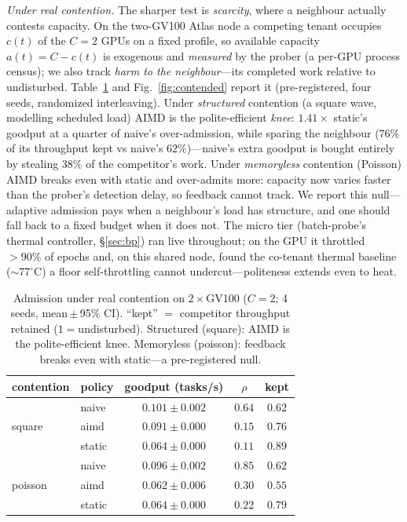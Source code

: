 \documentclass[conference]{IEEEtran}
\begin{document}
\emph{Under real contention.} The sharper test is \emph{scarcity}, where a
neighbour actually contests capacity. On the two-GV100 Atlas node a competing
tenant occupies $c(t)$ of the $C{=}2$ GPUs on a fixed profile, so available
capacity $a(t){=}C{-}c(t)$ is exogenous and \emph{measured} by the prober (a
per-GPU process census); we also track \emph{harm to the neighbour}---its completed
work relative to undisturbed. Table~\ref{tab:contended} and Fig.~\ref{fig:contended}
report it (pre-registered, four seeds, randomized interleaving). Under
\emph{structured} contention (a square wave, modelling scheduled load) AIMD is the
polite-efficient \emph{knee}: $1.41\times$ static's goodput at a quarter of naive's
over-admission, while sparing the neighbour ($76\%$ of its throughput kept vs
naive's $62\%$)---naive's extra goodput is bought entirely by stealing $38\%$ of the
competitor's work. Under \emph{memoryless} contention (Poisson) AIMD breaks even
with static and over-admits more: capacity now varies faster than the prober's
detection delay, so feedback cannot track. We report this null---adaptive admission
pays when a neighbour's load has structure, and one should fall back to a fixed
budget when it does not. The micro tier (batch-probe's thermal controller,
\S\ref{sec:bp}) ran live throughout; on the GPU it throttled $>\!90\%$ of epochs
and, on this shared node, found the co-tenant thermal baseline ($\sim$$77^\circ$C)
a floor self-throttling cannot undercut---politeness extends even to heat.

\begin{table}[t]\centering\caption{Admission under real contention on
$2{\times}$GV100 ($C{=}2$; 4 seeds, mean\,$\pm$\,95\% CI). ``kept'' $=$ competitor
throughput retained ($1{=}$undisturbed). Structured (square): AIMD is the
polite-efficient knee. Memoryless (poisson): feedback breaks even with static---a
pre-registered null.}\label{tab:contended}
\begin{tabular}{llccc}\toprule
contention & policy & goodput (tasks/s) & $\rho$ & kept \\\midrule
\multirow{3}{*}{square}
 & naive  & $0.101\pm0.002$ & $0.64$ & $0.62$ \\
 & aimd   & $0.091\pm0.000$ & $0.15$ & $0.76$ \\
 & static & $0.064\pm0.000$ & $0.11$ & $0.89$ \\\midrule
\multirow{3}{*}{poisson}
 & naive  & $0.096\pm0.002$ & $0.85$ & $0.62$ \\
 & aimd   & $0.062\pm0.006$ & $0.30$ & $0.55$ \\
 & static & $0.064\pm0.000$ & $0.22$ & $0.79$ \\\bottomrule
\end{tabular}
\end{table}
\end{document}
